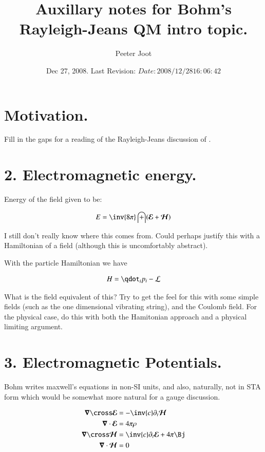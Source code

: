 \documentclass{article}
\title{ Auxillary notes for Bohm's Rayleigh-Jeans QM intro topic. }
\author{Peeter Joot}
\date{ Dec 27, 2008.  Last Revision: $Date: 2008/12/28 16:06:42 $ }
\newcommand{\EE}[0]{\boldsymbol{\mathcal{E}}}
\newcommand{\HH}[0]{\boldsymbol{\mathcal{H}}}
\begin{document}
\maketitle{}


\section{ Motivation. }

Fill in the gaps for a reading of the
Rayleigh-Jeans discussion of \cite{bohm1989qt}.

\section{ 2. Electromagnetic energy. }

Energy of the field given to be:

\begin{align*}
E = \inv{8\pi} \int (\EE + \HH)
\end{align*}

I still don't really know where this comes from.
Could perhaps justify this with a Hamiltonian of a field (although this is
uncomfortably abstract).

With the particle Hamiltonian we have

\begin{align*}
H = \qdot_i p_i -\LL
\end{align*}

What is the field equivalent of this?  Try to get the feel for this with some simple fields (such as the one dimensional vibrating string), and the Coulomb field.  For the physical case, do this with both the Hamitonian approach and a physical limiting argument.

\section{ 3. Electromagnetic Potentials. }

Bohm writes maxwell's equations in non-SI units, and also, naturally, not in STA form which would be somewhat more natural for a gauge
discussion.

\begin{align*}
\spacegrad \cross \EE &= -\inv{c} \partial_t \HH \\
\spacegrad \cdot \EE &= 4 \pi \rho \\
\spacegrad \cross \HH &= \inv{c} \partial_t \EE + 4 \pi \Bj \\
\spacegrad \cdot \HH &= 0
\end{align*}
\end{document}
